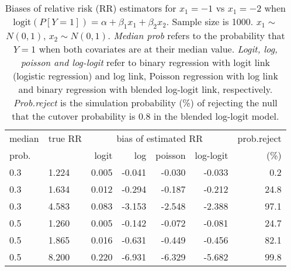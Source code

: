 \documentclass[12pt,a4paper]{article}
\begin{document}
\begin{table}[H] 
\small\sf\centering 
\caption{Biases of relative risk (RR) estimators for $x_1=-1$ vs $x_1=-2$ when $\mbox{logit}(P[Y=1])=\alpha+\beta_1 x_1 + \beta_2 x_2$. Sample size is 1000. $x_1 \sim $$N(0,1)$, $x_2 \sim N(0,1)$. {\it Median prob} refers to the probability that $Y=1$ when both covariates are at their median value. {\it Logit, log, poisson and log-logit} refer to binary regression with logit link (logistic regression) and log link, Poisson regression with log link and binary regression with blended log-logit link, respectively. {\it Prob.reject} is the simulation probability (\%) of rejecting the null that the cutover probability is $0.8$ in the blended log-logit model.} 
\begin{tabular}{llrrrrr} 
\toprule 
median & true RR & \multicolumn{4}{c}{bias of estimated RR} & prob.reject \\ 
prob. & & logit & log & poisson & log-logit  & (\%) \\ \midrule 
0.3 & 1.224 & 0.005 & -0.041 & -0.030 & -0.033 &  0.2 \\  
0.3 & 1.634 & 0.012 & -0.294 & -0.187 & -0.212 & 24.8 \\  
0.3 & 4.583 & 0.083 & -3.153 & -2.548 & -2.388 & 97.1 \\  
0.5 & 1.260 & 0.005 & -0.142 & -0.072 & -0.081 & 24.7 \\  
0.5 & 1.865 & 0.016 & -0.631 & -0.449 & -0.456 & 82.1 \\  
0.5 & 8.200 & 0.220 & -6.931 & -6.329 & -5.682 & 99.8 \\  
\bottomrule 
\end{tabular} 
\end{table} 
\end{document}

